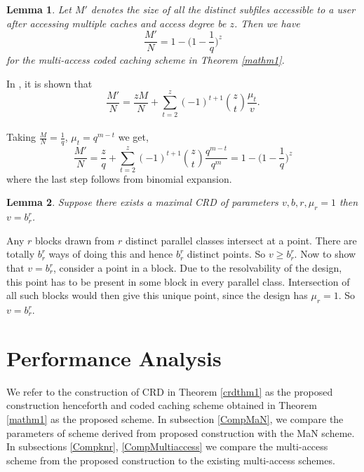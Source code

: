\documentclass[conference]{IEEEtran}
\newtheorem{lem}{Lemma}
\begin{document}
\begin{lem}
		Let $M'$ denotes the size of all the distinct subfiles accessible to a user after accessing multiple caches and access degree be $z$. Then we have
		$$\frac{M'}{N} = 1 - \Big(1 - \frac{1}{q}\Big)^z$$
		for the multi-access coded caching scheme in Theorem \ref{mathm1}.
\end{lem}
\begin{IEEEproof}
In \cite{KNRarXiv}, it is shown that $$\frac{M'}{N}= \frac{zM}{N}+\sum_{t=2}^z (-1)^{t+1}\binom{z}{t}\frac{\mu_t}{v}.$$\\
			Taking $\frac{M}{N} = \frac{1}{q}$, $\mu_t = q^{m-t}$ we get, \\
			\begin{equation*}
			\frac{M'}{N} = \frac{z}{q} + \sum_{t=2}^z (-1)^{t+1}\binom{z}{t}\frac{q^{m-t}}{q^m}
			= 1 - \Big(1 - \frac{1}{q}\Big)^z
			\end{equation*}
			where the last step follows from binomial expansion.	
		\end{IEEEproof}
\begin{lem}
\label{onlymaxcrdlem}
Suppose there exists a maximal CRD of parameters $v,b,r,\mu_{r} = 1$ then $v = b_r ^ r$.
\end{lem}
\begin{IEEEproof}
Any $r$ blocks drawn from $r$ distinct parallel classes intersect at a point. There are totally $b_r ^ r$ ways of doing this and hence $b_r ^ r$ distinct points. So $v \geq b_r ^ r$. 
Now to show that $v = b_r ^ r$, consider a point in a block. Due to the resolvability of the design, this point has to be present in some block in every parallel class. Intersection of all such blocks would then give this unique point, since the design has $\mu_r = 1$. So $v = b_r ^ r$.
\end{IEEEproof}
\section{Performance Analysis}
We refer to the construction of CRD in Theorem \ref{crdthm1} as the proposed construction henceforth and coded caching scheme obtained in Theorem \ref{mathm1} as the proposed scheme. In subsection \ref{CompMaN}, we compare the parameters of scheme derived from proposed construction with the MaN scheme. In subsections \ref{Compknr}, \ref{CompMultiaccess} we compare the multi-access scheme from the proposed construction to the existing multi-access schemes.
\end{document}
